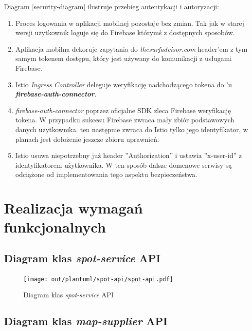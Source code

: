 Diagram \ref{security-diagram} ilustruje przebieg autentykacji i autoryzacji:
\begin{enumerate}
    \item
    Proces logowania w aplikacji mobilnej pozostaje bez zmian. Tak jak w starej wersji użytkownik loguje się do Firebase którymś z dostępnych sposobów.

    \item
    Aplikacja mobilna dekoruje zapytania do \emph{thesurfadvisor.com} header'em z tym samym tokenem dostępu, który jest używany do komunikacji z usługami Firebase.

    \item
    Istio \emph{Ingress Controller} deleguje weryfikację nadchodzącego tokena do 'u \textbf{\emph{firebase-auth-connector}}.

    \item
    \emph{firebase-auth-connector} poprzez oficjalne SDK zleca Firebase weryfikację tokena.
    W przypadku sukcesu Firebase zwraca mały zbiór podstawowych danych użytkownika.
     ten następnie zwraca do Istio tylko jego identyfikator, w planach jest dołożenie jeszcze zbioru uprawnień. 

    \item
    Istio usuwa niepotrzebny już header ''Authorization'' i ustawia ''x-user-id'' z identyfikatorem użytkownika.
    W ten sposób dalsze domenowe serwisy są odciążone od implementowania tego aspektu bezpieczeństwa.
\end{enumerate} 



\section{Realizacja wymagań funkcjonalnych}

\subsection{Diagram klas \emph{spot-service} API}

\begin{figure}[H]
	\begin{center}
		\texttt{[image: out/plantuml/spot-api/spot-api.pdf]}
	\end{center}
    \caption{Diagram klas \emph{spot-service} API}
    \label{spot-api}
\end{figure}

\subsection{Diagram klas \emph{map-supplier} API}

